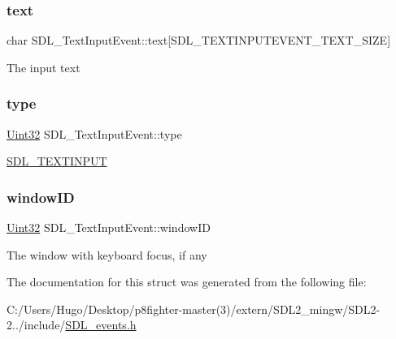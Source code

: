 \subsubsection{\texorpdfstring{text}{text}}
{\footnotesize\ttfamily char S\+D\+L\+\_\+\+Text\+Input\+Event\+::text\mbox{[}S\+D\+L\+\_\+\+T\+E\+X\+T\+I\+N\+P\+U\+T\+E\+V\+E\+N\+T\+\_\+\+T\+E\+X\+T\+\_\+\+S\+I\+ZE\mbox{]}}

The input text \mbox{\label{struct_s_d_l___text_input_event_a90576be2ea52e694deff40d0586654f5}} 
\subsubsection{\texorpdfstring{type}{type}}
{\footnotesize\ttfamily \hyperlink{_s_d_l__stdinc_8h_add440eff171ea5f55cb00c4a9ab8672d}{Uint32} S\+D\+L\+\_\+\+Text\+Input\+Event\+::type}

\hyperlink{_s_d_l__events_8h_a3b589e89be6b35c02e0dd34a55f3fccaa4fa2570088f6b9cbd109ae91b511368f}{S\+D\+L\+\_\+\+T\+E\+X\+T\+I\+N\+P\+UT} \mbox{\label{struct_s_d_l___text_input_event_aeb4f7a939353990ca40261ffbfbeb3d0}} 
\subsubsection{\texorpdfstring{window\+ID}{windowID}}
{\footnotesize\ttfamily \hyperlink{_s_d_l__stdinc_8h_add440eff171ea5f55cb00c4a9ab8672d}{Uint32} S\+D\+L\+\_\+\+Text\+Input\+Event\+::window\+ID}

The window with keyboard focus, if any 

The documentation for this struct was generated from the following file\+:\begin{DoxyCompactItemize}
\item 
C\+:/\+Users/\+Hugo/\+Desktop/p8fighter-\/master(3)/extern/\+S\+D\+L2\+\_\+mingw/\+S\+D\+L2-\/2../include/\hyperlink{_s_d_l__events_8h}{S\+D\+L\+\_\+events.\+h}\end{DoxyCompactItemize}
